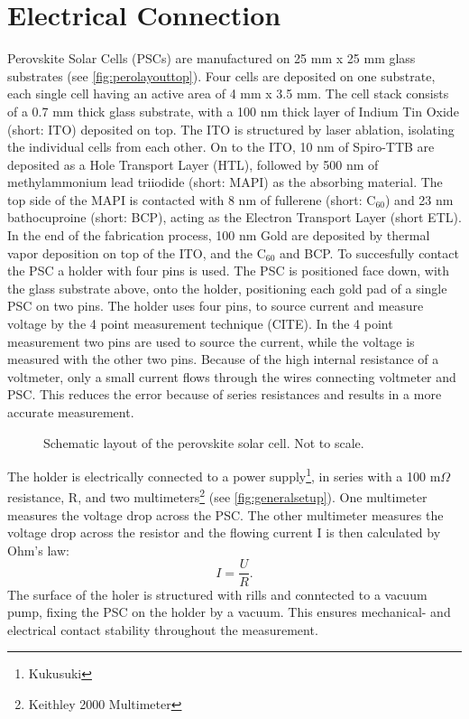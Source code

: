 \section{Electrical Connection}\label{sec:electricalconnection}
Perovskite Solar Cells (PSCs) are manufactured on 25 mm x 25 mm glass substrates (see \autoref{fig:perolayouttop}). Four cells are deposited on one substrate, each single cell having an active area of 4 mm x 3.5 mm. The cell stack consists of a 0.7 mm thick glass substrate, with a 100 nm thick layer of Indium Tin Oxide (short: ITO) deposited on top. The ITO is structured by laser ablation, isolating the individual cells from each other. On to the ITO, 10 nm of Spiro-TTB are deposited as a Hole Transport Layer (HTL), followed by 500 nm of methylammonium lead triiodide (short: MAPI) as the absorbing material. The top side of the MAPI is contacted with 8 nm of fullerene (short: C$_{60}$) and 23 nm bathocuproine (short: BCP), acting as the Electron Transport Layer (short ETL). In the end of the fabrication process, 100 nm Gold are deposited by thermal vapor deposition on top of the ITO, and the C$_{60}$ and BCP. To succesfully contact the PSC a holder with four pins is used. The PSC is positioned face down, with the glass substrate above, onto the holder, positioning each gold pad of a single PSC on two pins. The holder uses four pins, to source current and measure voltage by the 4 point measurement technique (CITE). In the 4 point measurement two pins are used to source the current, while the voltage is measured with the other two pins. Because of the high internal resistance of a voltmeter, only a small current flows through the wires connecting voltmeter and PSC. This reduces the error because of series resistances and results in a more accurate measurement.
\begin{figure}
	\centering
	
	\caption{Schematic layout of the perovskite solar cell. Not to scale.}
	\label{fig:perolayouttop}
\end{figure}

The holder is electrically connected to a power supply\footnote{Kukusuki}, in series with a 100 m$\Omega$ resistance, R, and two multimeters\footnote{Keithley 2000 Multimeter} (see \autoref{fig:generalsetup}). One multimeter measures the voltage drop across the PSC. The other multimeter measures the voltage drop across the resistor and the flowing current I is then calculated by Ohm's law:
\begin{equation}
	I = \frac{U}{R}.
\end{equation}
The surface of the holer is structured with rills and conntected to a vacuum pump, fixing the PSC on the holder by a vacuum. This ensures mechanical- and electrical contact stability throughout the measurement.


